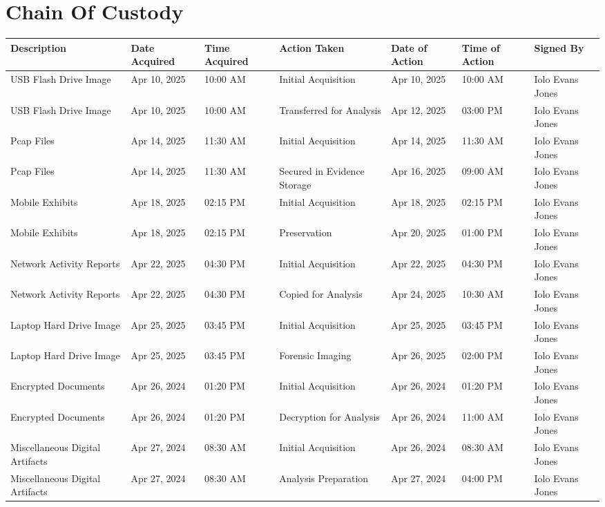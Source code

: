 \chapter{Chain Of Custody}

\begin{longtable}{|p{2.3cm}|p{1.8cm}|p{1.8cm}|p{2.7cm}|p{1.8cm}|p{1.8cm}|p{1.8cm}|}
  \hline
  \textbf{Description} & \textbf{Date Acquired} & \textbf{Time Acquired} & \textbf{Action Taken} & \textbf{Date of Action} & \textbf{Time of Action} & \textbf{Signed By} \\
  \hline
  \endhead
  
  USB Flash Drive Image & Apr 10, 2025 & 10:00 AM & Initial Acquisition & Apr 10, 2025 & 10:00 AM & Iolo Evans Jones \\
  \hline
  USB Flash Drive Image & Apr 10, 2025 & 10:00 AM & Transferred for Analysis & Apr 12, 2025 & 03:00 PM & Iolo Evans Jones \\
  \hline
  Pcap Files & Apr 14, 2025 & 11:30 AM & Initial Acquisition & Apr 14, 2025 & 11:30 AM & Iolo Evans Jones \\
  \hline
  Pcap Files & Apr 14, 2025 & 11:30 AM & Secured in Evidence Storage & Apr 16, 2025 & 09:00 AM & Iolo Evans Jones \\
  \hline
  Mobile Exhibits & Apr 18, 2025 & 02:15 PM & Initial Acquisition & Apr 18, 2025 & 02:15 PM & Iolo Evans Jones \\
  \hline
  Mobile Exhibits & Apr 18, 2025 & 02:15 PM & Preservation & Apr 20, 2025 & 01:00 PM & Iolo Evans Jones \\
  \hline
  Network Activity Reports & Apr 22, 2025 & 04:30 PM & Initial Acquisition & Apr 22, 2025 & 04:30 PM & Iolo Evans Jones \\
  \hline
  Network Activity Reports & Apr 22, 2025 & 04:30 PM & Copied for Analysis & Apr 24, 2025 & 10:30 AM & Iolo Evans Jones \\
  \hline
  Laptop Hard Drive Image & Apr 25, 2025 & 03:45 PM & Initial Acquisition & Apr 25, 2025 & 03:45 PM & Iolo Evans Jones \\
  \hline
  Laptop Hard Drive Image & Apr 25, 2025 & 03:45 PM & Forensic Imaging & Apr 26, 2025 & 02:00 PM & Iolo Evans Jones \\
  \hline
  Encrypted Documents & Apr 26, 2024 & 01:20 PM & Initial Acquisition & Apr 26, 2024 & 01:20 PM & Iolo Evans Jones \\
  \hline
  Encrypted Documents & Apr 26, 2024 & 01:20 PM & Decryption for Analysis & Apr 26, 2024 & 11:00 AM & Iolo Evans Jones \\
  \hline
  Miscellaneous Digital Artifacts & Apr 27, 2024 & 08:30 AM & Initial Acquisition & Apr 26, 2024 & 08:30 AM & Iolo Evans Jones \\
  \hline
  Miscellaneous Digital Artifacts & Apr 27, 2024 & 08:30 AM & Analysis Preparation & Apr 27, 2024 & 04:00 PM & Iolo Evans Jones \\
  \hline
  \end{longtable}